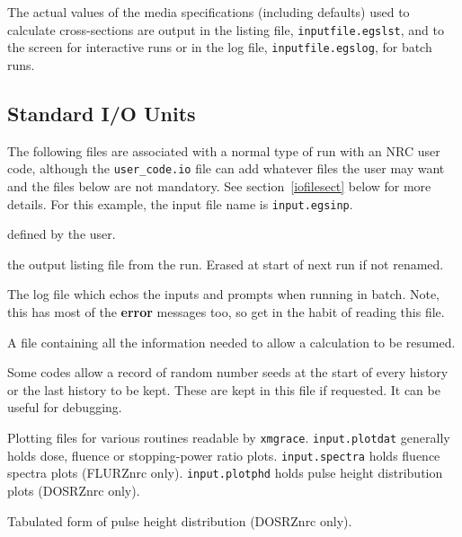 \documentclass[12pt,twoside]{article}  %
\begin{document}
The actual values of the media specifications (including defaults) used to calculate cross-sections are
output in the listing file, {\tt inputfile.egslst}, and to the screen for interactive runs or in the
log file, {\tt inputfile.egslog}, for batch runs.

\subsection{Standard I/O Units}
\label{iounits}
The following files are associated with a normal type of run with an NRC
user code, although the {\tt user\_code.io} file can add whatever files
the user
may want and the files below are not mandatory.  See section~\ref{iofilesect}
below for more details.  For
this example, the input file name is \verb+input.egsinp+.
\begin{description}

\item [input.egsinp:] defined by the user.

\item [input.egslst:]  the output listing file from the run. Erased
at start of next run if not renamed.

\item [input.egslog:] The log file which echos the inputs and
prompts when running in batch. Note, this has most of the {\bf error}
messages too, so get in the habit of reading this file.

\item [input.egsdat:] A file containing all the information needed to
allow a calculation to be resumed.

\item [input.egsrns:] Some codes allow a record of random number seeds
at the start of every history or the last history to be kept. These are
kept in this file if requested. It can be useful for debugging.

\item [input.plotdat, input.spectra, input.plotphd:] Plotting files for
various routines readable by \verb+xmgrace+.  {\tt input.plotdat} generally
holds dose, fluence or stopping-power ratio plots. {\tt input.spectra}
holds fluence spectra plots (FLURZnrc only).  {\tt input.plotphd} holds
pulse height distribution plots (DOSRZnrc only).

\item [input.egseff:] Tabulated form of pulse height distribution
(DOSRZnrc only).


\end{description}
\end{document}
